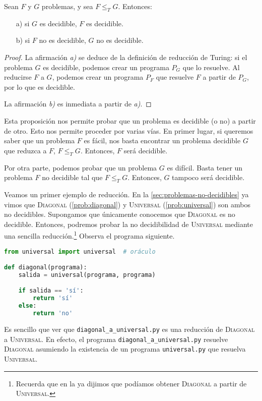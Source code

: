 \begin{proposicion}\label{prop:decidible-reduccion}
Sean $F$ y $G$ problemas, y sea $F\leq_T G$. Entonces:
\begin{itemize}
    \item[a)] si $G$ es decidible, $F$ es decidible.
    \item[b)] si $F$ no es decidible, $G$ no es decidible.
\end{itemize}
\end{proposicion}
\begin{proof}
La afirmación \textit{a)} se deduce de la definición de reducción de Turing: si el problema $G$ es decidible, podemos crear un programa $P_G$ que lo resuelve. Al reducirse $F$ a $G$, podemos crear un programa $P_F$ que resuelve $F$ a partir de $P_G$, por lo que es decidible.

La afirmación \textit{b)} es inmediata a partir de \textit{a)}.
\end{proof}

Esta proposición nos permite probar que un problema es decidible (o no) a partir de otro. Esto nos permite proceder por varias vías. En primer lugar, si queremos saber que un problema $F$ es fácil, nos basta encontrar un problema decidible $G$ que reduzca a $F$, $F\leq_TG$. Entonces, $F$ será decidible.

Por otra parte, podemos probar que un problema $G$ es difícil. Basta tener un problema $F$ no decidible tal que $F\leq_TG$. Entonces, $G$ tampoco será decidible.

Veamos un primer ejemplo de reducción. En la \cref{sec:problemas-no-decidibles} ya vimos que \textsc{Diagonal} (\cref{prob:diagonal}) y \textsc{Universal} (\cref{prob:universal}) son ambos no decidibles. Supongamos que únicamente conocemos que \textsc{Diagonal} es no decidible. Entonces, podremos probar la no decidibilidad de \textsc{Universal} mediante una sencilla reducción.\footnote{Recuerda que en la  ya dijimos que podíamos obtener \textsc{Diagonal} a partir de \textsc{Universal}.} Observa el programa siguiente.
\vspace{8pt}
\begin{lstlisting}[language=Python, caption=\lstinline{diagonal_a_universal.py},label={lst:diagonal-a-universal}]
from universal import universal  # oráculo

def diagonal(programa):
    salida = universal(programa, programa)

    if salida == 'sí':
        return 'sí'
    else:
        return 'no'
\end{lstlisting}
Es sencillo que ver que \texttt{diagonal\_a\_universal.py} es una reducción de \textsc{Diagonal} a \textsc{Universal}. En efecto, el programa \texttt{diagonal\_a\_universal.py} resuelve \textsc{Diagonal} asumiendo la existencia de un programa \texttt{universal.py} que resuelva \textsc{Universal}.

